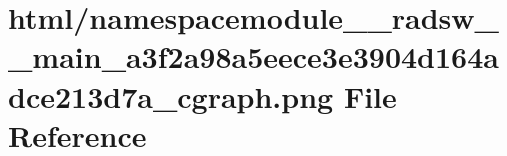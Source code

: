 \hypertarget{namespacemodule____radsw____main__a3f2a98a5eece3e3904d164adce213d7a__cgraph_8png}{}\section{html/namespacemodule\+\_\+\+\_\+radsw\+\_\+\+\_\+main\+\_\+a3f2a98a5eece3e3904d164adce213d7a\+\_\+cgraph.png File Reference}
\label{namespacemodule____radsw____main__a3f2a98a5eece3e3904d164adce213d7a__cgraph_8png}
